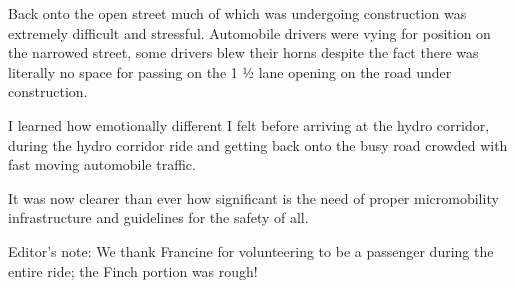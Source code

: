 \documentclass[letter]{ourGreenwayBrand}
\begin{document}
Back onto the open street much of which was undergoing construction was extremely difficult and stressful. Automobile drivers were vying for position on the narrowed street, some drivers blew their horns despite the fact there was literally no space for passing on the 1 ½ lane opening on the road under construction.

I learned how emotionally different I felt before arriving at the hydro corridor, during the hydro corridor ride and getting back onto the busy road crowded with fast moving automobile traffic.

It was now clearer than ever how significant is the need of proper micromobility infrastructure and guidelines for the safety of all.

Editor’s note: We thank Francine for volunteering to be a passenger during the entire ride; the Finch portion was rough!

\vspace{2em}
\end{document}

